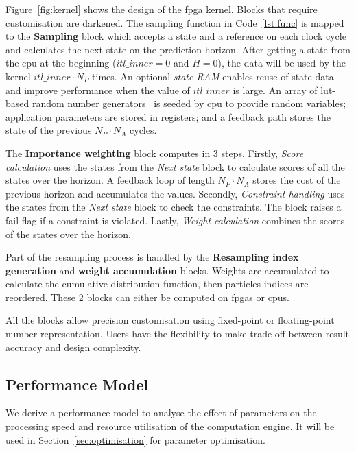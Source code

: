 Figure~\ref{fig:kernel} shows the design of the \gls{fpga} kernel. Blocks that require customisation are darkened.
The sampling function in Code~\ref{lst:func} is mapped to the \textbf{Sampling} block which accepts a state and a reference on each clock cycle and calculates the next state on the prediction horizon.
After getting a state from the \gls{cpu} at the beginning ($itl\_inner=0$ and $H=0$), the data will be used by the kernel $itl\_inner \cdot N_P$ times.
An optional \textit{state RAM} enables reuse of state data and improve performance when the value of $itl\_inner$ is large.
An array of \gls{lut}-based random number generators~\cite{thomas07,thomas10} is seeded by \gls{cpu} to provide random variables; application parameters are stored in registers; and
a feedback path stores the state of the previous $N_P \cdot N_A$ cycles.

The \textbf{Importance weighting} block computes in 3 steps.
Firstly, \textit{Score calculation} uses the states from the \emph{Next state} block to calculate scores of all the states over the horizon.
A feedback loop of length $N_P \cdot N_A$ stores the cost of the previous horizon and accumulates the values.
Secondly, \textit{Constraint handling} uses the states from the \emph{Next state} block to check the constraints.
The block raises a fail flag if a constraint is violated.
Lastly, \textit{Weight calculation} combines the scores of the states over the horizon.

Part of the resampling process is handled by the \textbf{Resampling index generation} and \textbf{weight accumulation} blocks.
Weights are accumulated to calculate the cumulative distribution function, then particles indices are reordered.
These 2 blocks can either be computed on \gls{fpga}s or \gls{cpu}s.

All the blocks allow precision customisation using fixed-point or floating-point number representation.
Users have the flexibility to make trade-off between result accuracy and design complexity.


\subsection{Performance Model}
\label{sec:model}

We derive a performance model to analyse the effect of parameters on the processing speed and resource utilisation of the computation engine.
It will be used in Section~\ref{sec:optimisation} for parameter optimisation.

